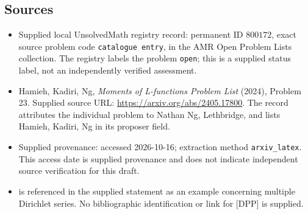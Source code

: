 \documentclass[11pt]{article}
\begin{document}
\subsection{Sources}
\begin{itemize}
\item Supplied local UnsolvedMath registry record: permanent ID \(800172\), exact source problem code \texttt{catalogue entry}, in the AMR Open Problem Lists collection. The registry labels the problem \texttt{open}; this is a supplied status label, not an independently verified assessment.
\item Hamieh, Kadiri, Ng, \emph{Moments of L-functions Problem List} (2024), Problem 23. Supplied source URL: \url{https://arxiv.org/abs/2405.17800}. The record attributes the individual problem to Nathan Ng, Lethbridge, and lists Hamieh, Kadiri, Ng in its proposer field.
\item Supplied provenance: accessed 2026-10-16; extraction method \texttt{arxiv\_latex}. This access date is supplied provenance and does not indicate independent source verification for this draft.
\item [DPP] is referenced in the supplied statement as an example concerning multiple Dirichlet series. No bibliographic identification or link for [DPP] is supplied.
\end{itemize}
\end{document}
